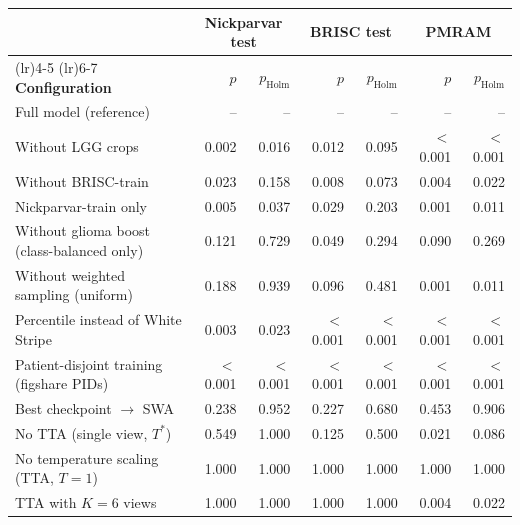 \begin{tabular}{>{\raggedright\arraybackslash}p{3.4cm} r r r r r r }
\toprule
 & \multicolumn{2}{c}{\textbf{Nickparvar test}} & \multicolumn{2}{c}{\textbf{BRISC test}} & \multicolumn{2}{c}{\textbf{PMRAM}} \\
\cmidrule(lr){2-3} \cmidrule(lr){4-5} \cmidrule(lr){6-7}
\textbf{Configuration} & $p$ & $p_{\mathrm{Holm}}$ & $p$ & $p_{\mathrm{Holm}}$ & $p$ & $p_{\mathrm{Holm}}$ \\
\midrule
Full model (reference) & -- & -- & -- & -- & -- & -- \\
\midrule
Without LGG crops & 0.002 & 0.016 & 0.012 & 0.095 & $<$0.001 & $<$0.001 \\
Without BRISC-train & 0.023 & 0.158 & 0.008 & 0.073 & 0.004 & 0.022 \\
Nickparvar-train only & 0.005 & 0.037 & 0.029 & 0.203 & 0.001 & 0.011 \\
Without glioma boost (class-balanced only) & 0.121 & 0.729 & 0.049 & 0.294 & 0.090 & 0.269 \\
Without weighted sampling (uniform) & 0.188 & 0.939 & 0.096 & 0.481 & 0.001 & 0.011 \\
Percentile instead of White Stripe & 0.003 & 0.023 & $<$0.001 & $<$0.001 & $<$0.001 & $<$0.001 \\
Patient-disjoint training (figshare PIDs) & $<$0.001 & $<$0.001 & $<$0.001 & $<$0.001 & $<$0.001 & $<$0.001 \\
\midrule
Best checkpoint $\rightarrow$ SWA & 0.238 & 0.952 & 0.227 & 0.680 & 0.453 & 0.906 \\
No TTA (single view, $T^{*}$) & 0.549 & 1.000 & 0.125 & 0.500 & 0.021 & 0.086 \\
No temperature scaling (TTA, $T=1$) & 1.000 & 1.000 & 1.000 & 1.000 & 1.000 & 1.000 \\
TTA with $K{=}6$ views & 1.000 & 1.000 & 1.000 & 1.000 & 0.004 & 0.022 \\
\bottomrule
\end{tabular}
